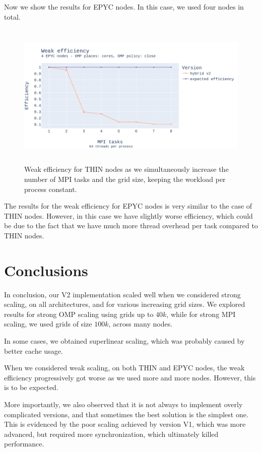 \documentclass{report}
\begin{document}
Now we show the results for EPYC nodes. In this case, we used four nodes in total.

\begin{figure}[H]
\centering
\includegraphics[width=14cm, height=7cm]{./images/weak_MPI_epyc_hybrid.pdf}
\caption{\label{fig:weakmpiepychybrid} Weak efficiency for THIN nodes as 
we simultaneously increase the number of MPI tasks and the grid size, keeping the 
workload per process constant.}
\end{figure}

The results for the weak efficiency for EPYC nodes is very similar to the case 
of THIN nodes. However, in this case we have slightly worse efficiency, which 
could be due to the fact that we have much more thread overhead per task compared 
to THIN nodes.



\section{Conclusions}

In conclusion, our V2 implementation scaled well when we considered strong scaling, 
on all architectures, and for various increasing grid sizes. We explored results for 
strong OMP scaling using grids up to $40k$, while for strong MPI scaling, we used 
grids of size $100k$, across many nodes.  

In some cases, we obtained superlinear scaling, which was probably caused by better 
cache usage. 

When we considered weak scaling, on both THIN and EPYC nodes, the weak 
efficiency progressively got worse as we used more and more nodes. However, 
this is to be expected.

More importantly, we also observed that it is not always to implement overly 
complicated versions, and that sometimes the best solution is the simplest one. 
This is evidenced by the poor scaling achieved by version V1, which was more 
advanced, but required more synchronization, which ultimately killed performance.
\end{document}
